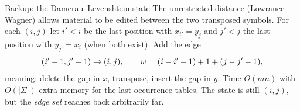 \begin{frame}{Backup: the Damerau--Levenshtein state}
	The unrestricted distance (Lowrance--Wagner) allows material to be edited between the two
	transposed symbols. For each $(i,j)$ let $i'<i$ be the last position with $x_{i'}=y_j$ and $j'<j$ the last
	position with $y_{j'}=x_i$ (when both exist). Add the edge
	\[
		(i'-1,j'-1)\to(i,j),\qquad w=(i-i'-1)+1+(j-j'-1),
	\]
	meaning: delete the gap in $x$, transpose, insert the gap in $y$.
	Time $O(mn)$ with $O(|\Sigma|)$ extra memory for the last-occurrence tables.
	The state is still $(i,j)$, but the \emph{edge set} reaches back arbitrarily far.
\end{frame}
